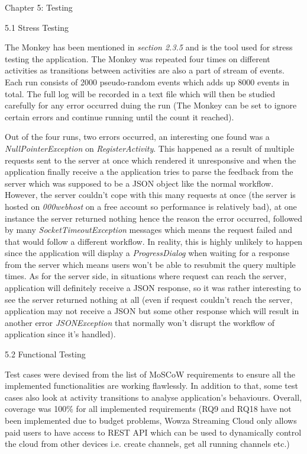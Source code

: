 \documentclass{article}
\begin{document}
\begin{flushleft}
{\huge Chapter 5: Testing}\par
{\Large 5.1 Stress Testing}\par
The Monkey has been mentioned in \textit{section 2.3.5} and is the tool used for stress testing the application. The Monkey was repeated four times on different activities as transitions between activities are also a part of stream of events. Each run consists of 2000 pseudo-random events which adds up 8000 events in total. The full log will be recorded in a text file which will then be studied carefully for any error occurred duing the run (The Monkey can be set to ignore certain errors and continue running until the count it reached).\par
Out of the four runs, two errors occurred, an interesting one found was a \textit{NullPointerException} on \textit{RegisterActivity}. This happened as a result of multiple requests sent to the server at once which rendered it unresponsive and when the application finally receive a  the application tries to parse the feedback from the server which was supposed to be a JSON object like the normal workflow. However, the server couldn't cope with this many requests at once (the server is hosted on \textit{000webhost} on a free account so performance is relatively bad), at one instance the server returned nothing hence the reason the error occurred, followed by many \textit{SocketTimeoutException} messages which means the request failed and that would follow a different workflow. In reality, this is highly unlikely to happen since the application will display a \textit{ProgressDialog} when waiting for a response from the server which means users won't be able to resubmit the query multiple times. As for the server side, in situations where request can reach the server, application will definitely receive a JSON response, so it was rather interesting to see the server returned nothing at all (even if request couldn't reach the server, application may not receive a JSON but some other response which will result in another error \textit{JSONException} that normally won't disrupt the workflow of application since it's handled).\par
{\Large 5.2 Functional Testing}\par
Test cases were devised from the list of MoSCoW requirements to ensure all the implemented functionalities are working flawlessly. In addition to that, some test cases also look at activity transitions to analyse application's behaviours. Overall, coverage was 100\% for all implemented requirements (RQ9 and RQ18 have not been implemented due to budget problems, Wowza Streaming Cloud only allows paid users to have access to REST API which can be used to dynamically control the cloud from other devices i.e. create channels, get all running channels etc.)\par

\end{flushleft}
\end{document}
